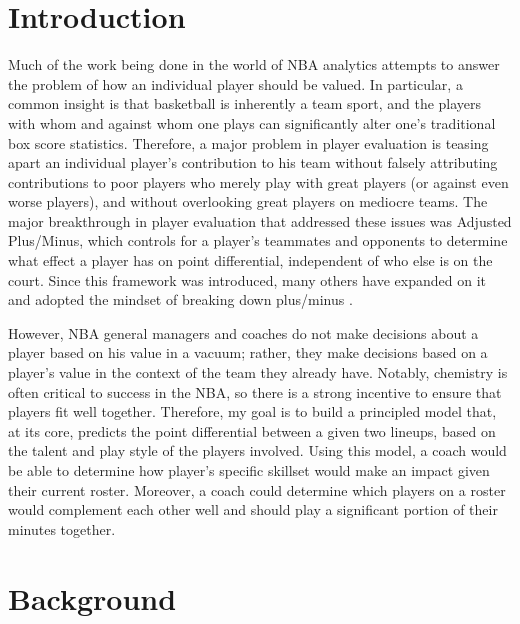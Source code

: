 \documentclass[12pt]{article}
\begin{document}
\maketitle

\doublespacing

\section{Introduction} \label{intro}

Much of the work being done in the world of NBA analytics attempts to answer
the problem of how an individual player should be valued. In particular, a
common insight is that basketball is inherently a team sport, and the players
with whom and against whom one plays can significantly alter one's traditional
box score statistics. Therefore, a major problem in player evaluation is
teasing apart an individual player's contribution to his team without falsely
attributing contributions to poor players who merely play with great players
(or against even worse players), and without overlooking great players on
mediocre teams. The major breakthrough in player evaluation that addressed
these issues was Adjusted Plus/Minus\cite{rosenbaum_2004}, which controls for a
player's teammates and opponents to determine what effect a player has on point
differential, independent of who else is on the court. Since this framework was
introduced, many others have expanded on it and adopted the mindset of breaking
down plus/minus \cite{englemann_2015}\cite{sill_2010}\cite{myers_2011}.

However, NBA general managers and coaches do not make decisions about a player
based on his value in a vacuum; rather, they make decisions based on a player's
value in the context of the team they already have. Notably, chemistry is often
critical to success in the NBA, so there is a strong incentive to ensure that
players fit well together\cite{schrage_2014}. Therefore, my goal is to build a
principled model that, at its core, predicts the point differential between a
given two lineups, based on the talent and play style of the players involved.
Using this model, a coach would be able to determine how player's specific
skillset would make an impact given their current roster. Moreover, a coach
could determine which players on a roster would complement each other well and
should play a significant portion of their minutes together.

\section{Background} \label{background}
\end{document}
